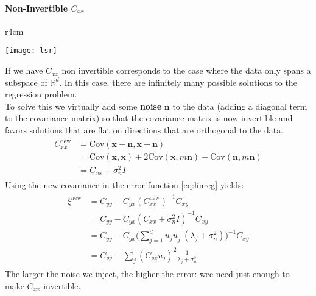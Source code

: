 \paragraph{Non-Invertible $C_{xx}$}
\begin{wrapfigure}[6]{r}{4cm}
\vspace{-.9cm}
\begin{center}
	\texttt{[image: lsr]}
\end{center}
\end{wrapfigure}
If we have $C_{xx}$ non invertible corresponds to the case  where the data only spans a subspace of $\mathbb{R}^d$. In this case, there are infinitely many possible solutions to the regression problem.\\
To solve this we virtually add some \textbf{noise} $\mathbf{n}$ to the data (adding a diagonal term to the covariance matrix) so that the covariance matrix is now invertible and favors solutions that are flat on directions that are orthogonal to the data.
\begin{align}
	\begin{split}
		C_{xx}^{\text{new}} & = \text{Cov} ( \mathbf{x}+\mathbf{n}, \mathbf{x} + \mathbf{n}) \\
		& = \text{Cov}(\mathbf{x}, \mathbf{x}) + 2 \text{Cov}(\mathbf{x}, m\mathbf{n}) + \text{Cov}(\mathbf{n}, m\mathbf{n})\\
		& = C_{xx}+\sigma_n^2I
	\end{split}
\end{align}
Using the new covariance in the error function \ref{eq:linreg} yields:
\begin{align}
	\begin{split}
		\xi^{\text{new}}&=C_{yy}-C_{yx}(C_{xx}^\text{new})^{-1}C_{xy} \\
		& = C_{yy} - C_{yx}(C_{xx} + \sigma_n^2 I)^{-1}C_{xy} \\
		& = C_{yy} - C_{yx} \bigg(\sum_{j=1}^{d} u_j u_j^\top ( \lambda_j + \sigma_n^2)\bigg)^{-1}C_{xy} \\
		& = C_{yy} - \sum_{j} (C_{yx}u_j)^2 \frac{1}{\lambda_j+\sigma_n^2}
	\end{split}
\end{align}
The larger the noise we inject, the higher the error: wee need just enough to make $C_{xx}$ invertible.

